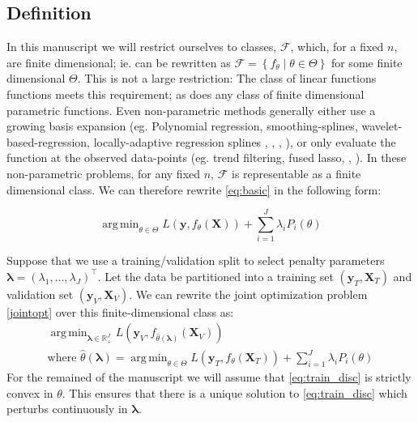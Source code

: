 \documentclass[10pt,letterpaper]{article}
\DeclareMathOperator*{\argmin}{arg\,min}
\begin{document}
\subsection{Definition}
In this manuscript we will restrict ourselves to classes, $\mathcal{F}$, which, for a fixed $n$, are finite dimensional; ie. can be rewritten as $\mathcal{F} = \left\{f_{\theta}\middle|\theta\in\Theta\right\}$ for some finite dimensional $\Theta$. This is not a large restriction: The class of linear functions functions meets this requirement; as does any class of finite dimensional parametric functions. Even non-parametric methods generally either use a growing basis expansion (eg. Polynomial regression, smoothing-splines, wavelet-based-regression, locally-adaptive regression splines \citep{tsybakov2008introduction}, \citep{wahba1981spline}, \citep{donoho1994ideal}, \citep{mammen1997locally}), or only evaluate the function at the observed data-points (eg. trend filtering, fused lasso, \citep{kim2009ell_1}, \citep{tibshirani2005sparsity}). In these non-parametric problems, for any fixed $n$, $\mathcal{F}$ is representable as a finite dimensional class.
We can therefore rewrite \eqref{eq:basic} in the following form:

\begin{equation}\label{eq:train_disc}
\argmin_{\theta \in \Theta} L(\boldsymbol{y}, f_\theta(\boldsymbol{X})) + \sum\limits_{i=1}^J \lambda_i P_i(\theta)
\end{equation}

Suppose that we use a training/validation split to select penalty parameters $\boldsymbol{\lambda} = (\lambda_1, ..., \lambda_J)^\top$. Let the data be partitioned into a training set $(\boldsymbol{y}_T , \boldsymbol{X}_T)$ and validation set $(\boldsymbol{y}_V, \boldsymbol{X}_V)$. We can rewrite the joint optimization problem \eqref{jointopt} over this finite-dimensional class as:
\begin{equation}
\begin{array}{c}
\argmin_{\boldsymbol{\lambda} \in \mathbb{R}^J_{+}} L(\boldsymbol{y}_V, f_{\hat{\theta}(\boldsymbol{\lambda})}(\boldsymbol{X}_V)) \\
\text{where } {\hat{\theta}(\boldsymbol{\lambda})} = \argmin_{\theta \in \Theta} L(\boldsymbol{y}_T, f_\theta (\boldsymbol{X}_T)) + \sum\limits_{i=1}^J \lambda_i P_i(\theta)
\end{array}
\label{jointopt2}
\end{equation}
For the remained of the manuscript we will assume that \eqref{eq:train_disc} is strictly convex in $\theta$. This ensures that there is a unique solution to \eqref{eq:train_disc} which perturbs continuously in $\boldsymbol{\lambda}$.
\end{document}

